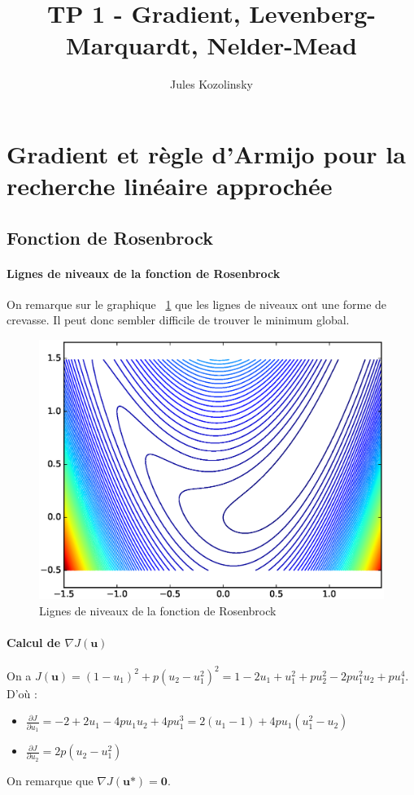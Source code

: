 \documentclass[paper=a4, fontsize=11pt]{article}
\title{\normalfont \normalsize 
\huge TP 1 - Gradient, Levenberg-Marquardt, Nelder-Mead}
\author{Jules Kozolinsky}
\date{}
\begin{document}
\maketitle

\section{Gradient et règle d'Armijo pour la recherche linéaire approchée}
\subsection{Fonction de Rosenbrock}
\paragraph{Lignes de niveaux de la fonction de Rosenbrock\\}
On remarque sur le graphique ~\ref{étiquette} que les lignes de niveaux ont une forme de crevasse. Il peut donc sembler difficile de trouver le minimum global. 
\begin{figure}[h]
 	\begin{center}
   \includegraphics[scale=0.6]{lignes-niveaux-rosenbrock}
   \end{center}
   \caption{\label{étiquette} Lignes de niveaux de la fonction de Rosenbrock}
\end{figure}

\paragraph{Calcul de $\nabla J(\textbf{u})$\\}
On a $J(\textbf{u}) = (1-u_1)^2 + p(u_2 - u_1^2)^2 = 1 - 2u_1 + u_1^2 + pu_2^2 - 2pu_1^2u_2 + pu_1^4$. \\
D'où : 
\begin{itemize}[label=\textbullet]
\item $\frac{\partial J }{\partial u_1} = -2 + 2u_1 - 4pu_1u_2 + 4pu_1^3 = 2(u_1-1) + 4pu_1(u_1^2-u_2) $ 
\item $\frac{\partial J }{\partial u_2} = 2p(u_2-u_1^2)$
\end{itemize}
On remarque que $\nabla J(\textbf{u*}) = \textbf{0}$.
\end{document}
